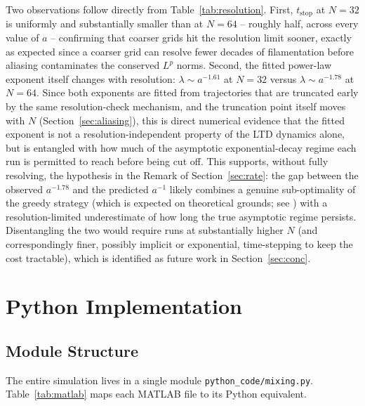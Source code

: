 \documentclass[12pt,a4paper]{article}
\theoremstyle{definition}
\theoremstyle{plain}
\begin{document}
Two observations follow directly from Table~\ref{tab:resolution}. First,
$t_{\text{stop}}$ at $N=32$ is uniformly and substantially smaller than at
$N=64$ -- roughly half, across every value of $a$ -- confirming that coarser
grids hit the resolution limit sooner, exactly as expected since a coarser
grid can resolve fewer decades of filamentation before aliasing
contaminates the conserved $L^p$ norms. Second, the fitted power-law
exponent itself changes with resolution: $\lambda\sim a^{-1.61}$ at $N=32$
versus $\lambda\sim a^{-1.78}$ at $N=64$. Since both exponents are fitted
from trajectories that are truncated early by the same resolution-check
mechanism, and the truncation point itself moves with $N$
(Section~\ref{sec:aliasing}), this is direct numerical evidence that the
fitted exponent is not a resolution-independent property of the LTD
dynamics alone, but is entangled with how much of the asymptotic
exponential-decay regime each run is permitted to reach before being cut
off. This supports, without fully resolving, the hypothesis in the Remark
of Section~\ref{sec:rate}: the gap between the observed $a^{-1.78}$ and the
predicted $a^{-1}$ likely combines a genuine sub-optimality of the greedy
strategy (which is expected on theoretical grounds; see
\cite{Iyer2014,Drivas2022}) with a resolution-limited underestimate of how
long the true asymptotic regime persists. Disentangling the two would
require runs at substantially higher $N$ (and correspondingly finer,
possibly implicit or exponential, time-stepping to keep the cost
tractable), which is identified as future work in Section~\ref{sec:conc}.

\section{Python Implementation}
\label{sec:impl}

\subsection{Module Structure}

The entire simulation lives in a single module \texttt{python\_code/mixing.py}.
Table~\ref{tab:matlab} maps each MATLAB file to its Python equivalent.
\end{document}
